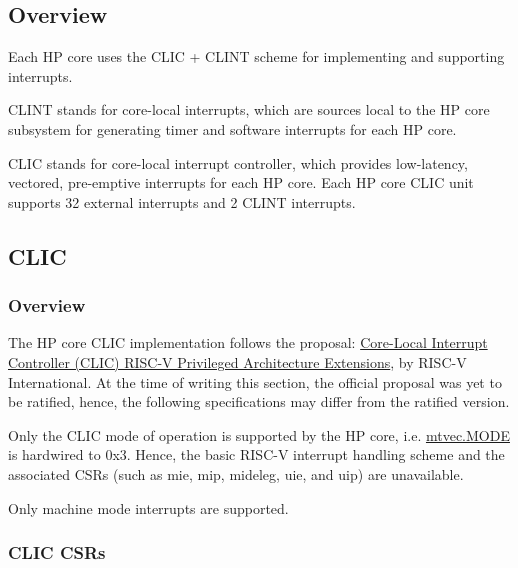 \documentclass[main\_\_EN.tex]{subfiles}
\begin{document}

\subsection{Overview}
\label{sec:riscvcpu-intr-overview}


Each HP core uses the CLIC + CLINT scheme for implementing and supporting interrupts.

CLINT stands for core-local interrupts, which are sources local to the HP core subsystem for generating timer and software interrupts for each HP core.

CLIC stands for core-local interrupt controller, which provides low-latency, vectored, pre-emptive interrupts for each HP core. Each HP core CLIC unit supports 32 external interrupts and 2 CLINT interrupts.


\subsection{CLIC}
\label{sec:riscvcpu-clic}

\subsubsection{Overview}
\label{sec:riscvcpu-clic-overview}

The HP core CLIC implementation follows the proposal: \href{https://github.com/riscv/riscv-fast-interrupt/blob/26d29ce6ab7f1def8e5dc0a41639a1d8f67ea339/clic.adoc}{Core-Local Interrupt Controller (CLIC) RISC-V Privileged Architecture Extensions}, by RISC-V International. At the time of writing this section, the official proposal was yet to be ratified, hence, the following specifications may differ from the ratified version.


Only the CLIC mode of operation is supported by the HP core, i.e. \hyperref[fielddesc:MTVECMODE]{mtvec.MODE} is hardwired to 0x3. Hence, the basic RISC-V interrupt handling scheme and the associated CSRs (such as mie, mip, mideleg, uie, and uip) are unavailable.

Only machine mode interrupts are supported.

\subsubsection{CLIC CSRs}
\label{sec:riscvcpu-clic-csrs}
\end{document}
